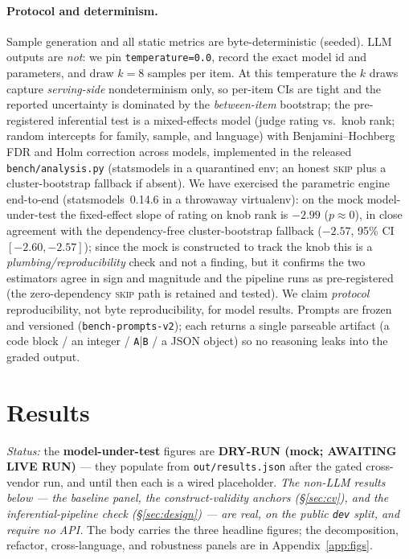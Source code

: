 \documentclass[11pt]{article}
\begin{document}
\paragraph{Protocol and determinism.} Sample generation and all static metrics are
byte-deterministic (seeded). LLM outputs are \emph{not}: we pin
\texttt{temperature=0.0}, record the exact model id and parameters, and draw $k=$8
samples per item. At this temperature the $k$ draws capture \emph{serving-side}
nondeterminism only, so per-item CIs are tight and the reported uncertainty is dominated by
the \emph{between-item} bootstrap; the pre-registered inferential test is a mixed-effects
model (judge rating vs.\ knob rank; random intercepts for family, sample, and language)
with Benjamini--Hochberg FDR and Holm correction across models, implemented in the released
\texttt{bench/analysis.py} (statsmodels in a quarantined env; an honest \textsc{skip} plus a
cluster-bootstrap fallback if absent). We have exercised the parametric engine
end-to-end (statsmodels~0.14.6 in a throwaway virtualenv): on the mock
model-under-test the fixed-effect slope of rating on knob rank is $-2.99$
($p\!\approx\!0$), in close agreement with the dependency-free cluster-bootstrap
fallback ($-2.57$, 95\% CI $[-2.60,-2.57]$); since the mock is constructed to track the
knob this is a \emph{plumbing/reproducibility} check and not a finding, but it confirms
the two estimators agree in sign and magnitude and the pipeline runs as pre-registered
(the zero-dependency \textsc{skip} path is retained and tested). We claim \emph{protocol}
reproducibility, not byte reproducibility, for model results. Prompts are frozen and
versioned (\texttt{bench-prompts-v2}); each returns a single parseable artifact (a code
block / an integer / \texttt{A}|\texttt{B} / a JSON object) so no reasoning leaks into
the graded output.

\section{Results}
\emph{Status:} the \textbf{model-under-test} figures are \textbf{DRY-RUN (mock; AWAITING
LIVE RUN)} --- they populate from \texttt{out/results.json} after the gated cross-vendor
run, and until then each is a wired placeholder. \emph{The non-LLM results below ---
the baseline panel, the construct-validity anchors (\S\ref{sec:cv}), and the
inferential-pipeline check (\S\ref{sec:design}) --- are real, on the public \texttt{dev}
split, and require no API.} The body carries the three headline figures; the
decomposition, refactor, cross-language, and robustness panels are in
Appendix~\ref{app:figs}.
\end{document}
